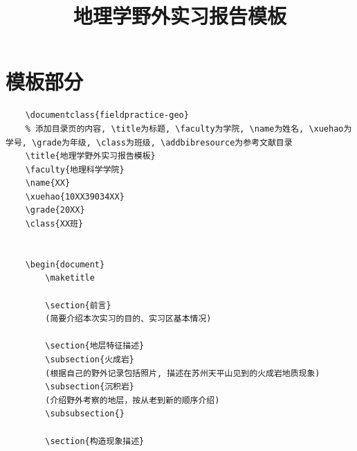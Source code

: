 \documentclass{fieldpractice-geo}
\title{地理学野外实习报告模板}
\begin{document}
	\maketitle
\section{模板部分}
\lstset{language=Tex}
\begin{lstlisting}
	\documentclass{fieldpractice-geo}
	% 添加目录页的内容, \title为标题, \faculty为学院, \name为姓名, \xuehao为学号, \grade为年级, \class为班级, \addbibresource为参考文献目录
	\title{地理学野外实习报告模板}
	\faculty{地理科学学院}
	\name{XX}
	\xuehao{10XX39034XX}
	\grade{20XX}
	\class{XX班}
	
	
	\begin{document}
		\maketitle
			
		\section{前言}
		(简要介绍本次实习的目的、实习区基本情况)
		
		\section{地层特征描述}
		\subsection{火成岩}
		(根据自己的野外记录包括照片, 描述在苏州天平山见到的火成岩地质现象)
		\subsection{沉积岩}
		(介绍野外考察的地层，按从老到新的顺序介绍)
		\subsubsection{}
		
		\section{构造现象描述}

\end{lstlisting}
\end{document}
